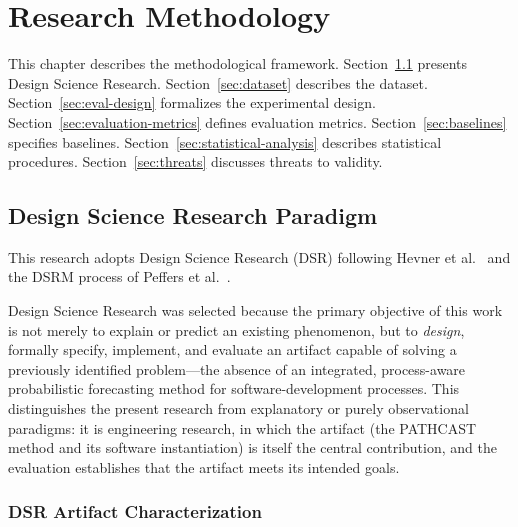 
\chapter{Research Methodology}
\label{ch:methodology}

This chapter describes the methodological framework. Section~\ref{sec:dsr}
presents Design Science Research. Section~\ref{sec:dataset} describes the
dataset. Section~\ref{sec:eval-design} formalizes the experimental design.
Section~\ref{sec:evaluation-metrics} defines evaluation metrics.
Section~\ref{sec:baselines} specifies baselines.
Section~\ref{sec:statistical-analysis} describes statistical procedures.
Section~\ref{sec:threats} discusses threats to validity.


\section{Design Science Research Paradigm}
\label{sec:dsr}

This research adopts Design Science Research (DSR) following
Hevner et al.~\cite{hevner2004} and the DSRM process of Peffers et
al.~\cite{peffers2007}.

Design Science Research was selected because the primary objective of this
work is not merely to explain or predict an existing phenomenon, but to
\emph{design}, formally specify, implement, and evaluate an artifact capable
of solving a previously identified problem---the absence of an integrated,
process-aware probabilistic forecasting method for software-development
processes. This distinguishes the present research from explanatory or
purely observational paradigms: it is engineering research, in which the
artifact (the PATHCAST method and its software instantiation) is itself the
central contribution, and the evaluation establishes that the artifact meets
its intended goals.

\subsection{DSR Artifact Characterization}
\label{sec:dsr-artifact}

